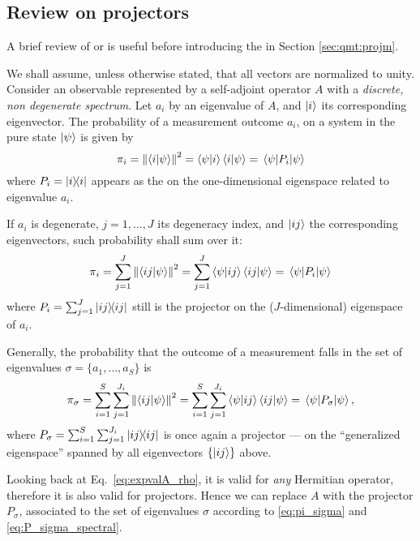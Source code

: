 \subsection{Review on projectors}

A brief review of  or 
is useful before introducing the 
in Section \ref{sec:qmt:projm}.

We shall assume, unless otherwise stated, that all vectors are
normalized to unity.
Consider an observable represented by a self-adjoint operator $A$
with a 
\emph{discrete, non degenerate spectrum}.
Let $a_i$ by an eigenvalue of $A$, and $\ket{i}$ its corresponding eigenvector.
The probability of a measurement
outcome $a_i$,
on a system in the pure state $\ket{\psi}$
is given by
$$
\pi_{i} = \norm{\braket{i}{\psi}}^2
        = \bra{\psi}\ket{i}\bra{i}\ket{\psi}
        = \mel{\psi}{P_{i}}{\psi}
$$
where $P_{i} = \ketbra{i}$ appears as the  on the
one-dimensional ei\-gen\-space related to eigenvalue  $a_i$.

If $a_i$ is degenerate, $j = 1, \dots, J$ its degeneracy index, and $\ket{ij}$ the corresponding eigenvectors,
such probability shall sum over it:
$$
\pi_{i} = \sum_{j=1}^{J}\norm{\braket{ij}{\psi}}^2
        = \sum_{j=1}^{J}\bra{\psi}\ket{ij}\bra{ij}\ket{\psi}
        = \mel{\psi}{P_{i}}{\psi}
$$
where $P_{i} = \sum_{j=1}^{J}\ketbra{ij}$
still is the projector on the
($J$-dimensional) eigenspace of $a_i$.

Generally, the probability that the outcome of a measurement falls in
the set of eigenvalues $\sigma = \{a_{1}, \dots, a_{S}\}$ is
\begin{equation}\label{eq:pi_sigma}
\pi_{\sigma}  = \sum_{i=1}^{S}\sum_{j=1}^{J_{i}}\norm{\braket{ij}{\psi}}^2
              = \sum_{i=1}^{S}\sum_{j=1}^{J_{i}}\bra{\psi}\ket{ij}\bra{ij}\ket{\psi}
              = \mel{\psi}{P_{\sigma}}{\psi}
              ,
\end{equation}
where $P_{\sigma} = \sum_{i=1}^{S}\sum_{j=1}^{J_{i}}\ketbra{ij}$
is once again a projector --- on the ``generalized eigenspace'' spanned by all
eigenvectors $\{\ket{ij}\}$ above.

Looking back at Eq.~\eqref{eq:expvalA_rho},
it is valid for \emph{any} Hermitian operator,
therefore it is also valid for projectors.
Hence we can replace $A$ with the projector $P_{\sigma}$,
associated to the set of eigenvalues $\sigma$
according to \eqref{eq:pi_sigma} and \eqref{eq:P_sigma_spectral}.

